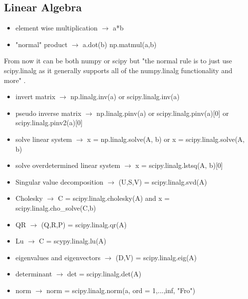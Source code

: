 \documentclass{article}
\begin{document}
\begin{multicols}{2}
\section{Linear Algebra}
\begin{itemize}
\item element wise multiplication $\rightarrow$ a*b
\item "normal" product  $\rightarrow$ a.dot(b) np.matmul(a,b)
\end{itemize}
From now it can be both numpy or scipy but "the normal rule is to just use scipy.linalg as it generally supports all of the numpy.linalg functionality and more" \cite{np_sp}.
\begin{itemize}
\item invert matrix $\rightarrow$ np.linalg.inv(a) or scipy.linalg.inv(a)
\item pseudo inverse matrix $\rightarrow$ np.linalg.pinv(a) or scipy.linalg.pinv(a)[0] or scipy.linalg.pinv2(a)[0]
\item solve linear system  $\rightarrow$ x = np.linalg.solve(A, b) or x = scipy.linalg.solve(A, b)
\item solve  overdetermined linear system $\rightarrow$ x = scipy.linalg.lstsq(A, b)[0]
\item Singular value decomposition $\rightarrow$ (U,S,V) = scipy.linalg.svd(A)
\item Cholesky $\rightarrow$ C = scipy.linalg.cholesky(A) and x = scipy.linalg.cho\_solve(C,b)
\item QR $\rightarrow$ (Q,R,P) = scipy.linalg.qr(A)
\item Lu $\rightarrow$ C = scypy.linalg.lu(A)
\item eigenvalues and eigenvectors $\rightarrow$ (D,V) = scipy.linalg.eig(A)
\item determinant $\rightarrow$ det = scipy.linalg.det(A)
\item norm $\rightarrow$ norm = scipy.linalg.norm(a, ord = 1,...,inf, "Fro")
\end{itemize}


\end{multicols}
\end{document}

